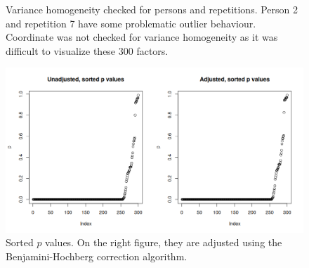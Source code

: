 \documentclass[11pt,fleqn]{article}
\begin{document}
\begin{figure}[H]
	\centering
	\caption{Variance homogeneity checked for persons and repetitions. Person 2 and repetition 7 have some problematic outlier behaviour. Coordinate was not checked for variance homogeneity as it was difficult to visualize these 300 factors. }
	\label{fig:vars}
\end{figure}


\begin{figure}[H]
	\centering
	\includegraphics[width=.7\textwidth]{pvalues}
	\caption{Sorted $ p $ values. On the right figure, they are adjusted using the Benjamini-Hochberg correction algorithm.}\label{fig:sortp}
\end{figure}
\end{document}
